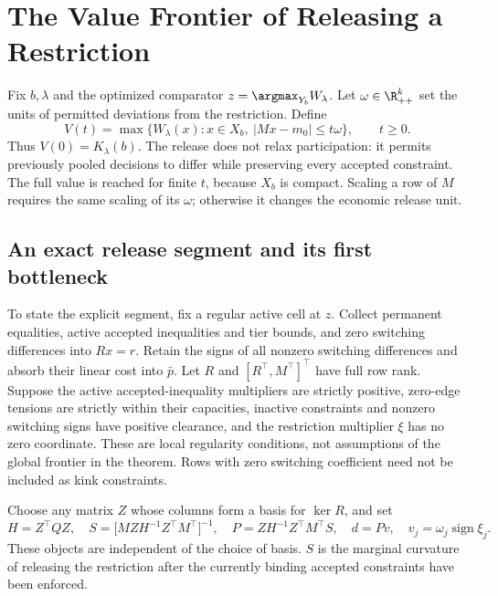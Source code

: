 \section{The Value Frontier of Releasing a Restriction}\label{sec:release}
Fix $b,\lambda$ and the optimized comparator $z=\argmax_{Y_b}W_\lambda$. Let $\omega\in\R^k_{++}$ set the units of permitted deviations from the restriction. Define
\begin{equation}\label{eq:release}
 V(t)=\max\{W_\lambda(x):x\in X_b,\ |Mx-m_0|\leq t\omega\},\qquad t\geq0.
\end{equation}
Thus $V(0)=K_\lambda(b)$. The release does not relax participation: it permits previously pooled decisions to differ while preserving every accepted constraint. The full value is reached for finite $t$, because $X_b$ is compact. Scaling a row of $M$ requires the same scaling of its $\omega$; otherwise it changes the economic release unit.

\subsection{An exact release segment and its first bottleneck}
To state the explicit segment, fix a regular active cell at $z$. Collect permanent equalities, active accepted inequalities and tier bounds, and zero switching differences into $Rx=r$. Retain the signs of all nonzero switching differences and absorb their linear cost into $\bar p$. Let $R$ and $[R^\top,M^\top]^\top$ have full row rank. Suppose the active accepted-inequality multipliers are strictly positive, zero-edge tensions are strictly within their capacities, inactive constraints and nonzero switching signs have positive clearance, and the restriction multiplier $\xi$ has no zero coordinate. These are local regularity conditions, not assumptions of the global frontier in the theorem. Rows with zero switching coefficient need not be included as kink constraints.

Choose any matrix $Z$ whose columns form a basis for $\ker R$, and set
\begin{equation}\label{eq:release-matrices}
 H=Z^\top QZ,\quad
 S=\bigl[MZH^{-1}Z^\top M^\top\bigr]^{-1},\quad
 P=ZH^{-1}Z^\top M^\top S,\quad
 d=P v,\quad v_j=\omega_j\operatorname{sign}\xi_j.
\end{equation}
These objects are independent of the choice of basis. $S$ is the marginal curvature of releasing the restriction after the currently binding accepted constraints have been enforced.

